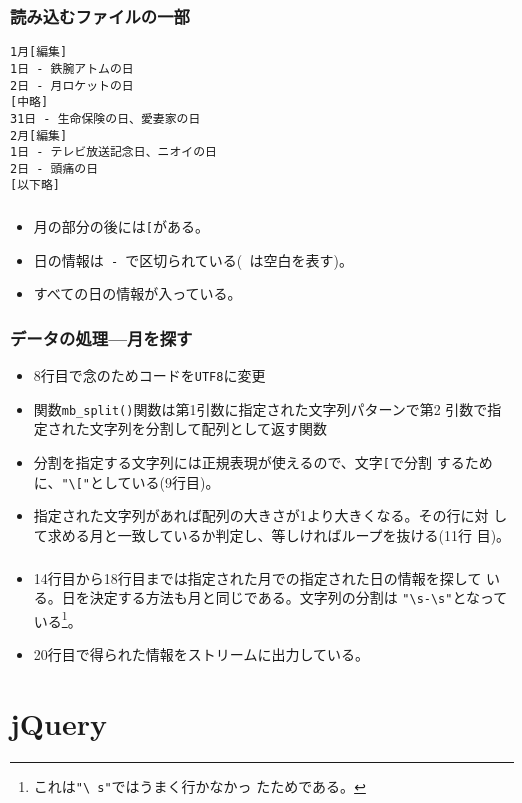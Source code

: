 \begin{frame}[containsverbatim]
\frametitle{読み込むファイルの一部}
\begin{Verbatim}
1月[編集]
1日 - 鉄腕アトムの日
2日 - 月ロケットの日
[中略]
31日 - 生命保険の日、愛妻家の日
2月[編集]
1日 - テレビ放送記念日、ニオイの日
2日 - 頭痛の日
[以下略]
\end{Verbatim}
\end{frame}
\begin{frame}[containsverbatim]
\frametitle{}
\begin{itemize}
 \item 月の部分の後には\texttt{[}がある。
 \item 日の情報は\verb*+ - +で区切られている(\verb*+ +は空白を表す)。
 \item すべての日の情報が入っている。
\end{itemize}
\end{frame}
\begin{frame}[containsverbatim]
\frametitle{データの処理---月を探す}
\begin{itemize}
 \item 8行目で念のためコードを\texttt{UTF8}に変更
 \item 関数\Verb+mb_split()+関数は第1引数に指定された文字列パターンで第2
       引数で指定された文字列を分割して配列として返す関数
 \item 分割を指定する文字列には正規表現が使えるので、文字\Verb+[+で分割
       するために、\Verb+"\["+としている(9行目)。
 \item 指定された文字列があれば配列の大きさが1より大きくなる。その行に対
       して求める月と一致しているか判定し、等しければループを抜ける(11行
       目)。
\end{itemize}
\end{frame}
\begin{frame}[containsverbatim]
\frametitle{}
\begin{itemize}
 \item 14行目から18行目までは指定された月での指定された日の情報を探して
       いる。日を決定する方法も月と同じである。文字列の分割は
       \verb+"\s-\s"+となっている\footnote{これは\texttt{"\textbackslash
       s"}ではうまく行かなかっ
       たためである。}。
 \item 20行目で得られた情報をストリームに出力している。
\end{itemize}
\end{frame}
\fi
\section{jQuery}

